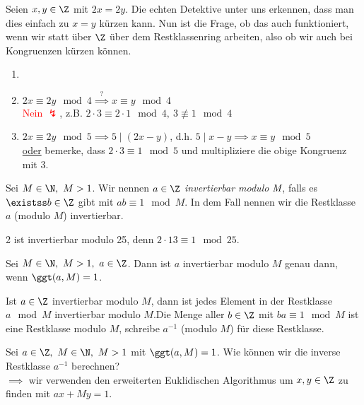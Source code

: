 Seien \( x,y \in \Z \) mit $2x = 2y $. Die echten Detektive unter uns erkennen, dass man dies einfach zu $x = y$ kürzen kann. Nun ist die Frage, ob das auch funktioniert, wenn wir statt über $\Z$ über dem Restklassenring arbeiten, also ob wir auch bei Kongruenzen kürzen können.

\begin{exmp*}
	\begin{enumerate}
		\item[]
		\item \( 2x \equiv 2y \mod 4 \overset{?}{\implies} x \equiv y \mod 4 \)\\
			\textcolor{red}{Nein $\lightning$}, z.B. \( 2 \cdot 3 \equiv 2 \cdot 1 \mod 4,\ 3 \not\equiv 1 \mod 4 \)
		\item \( 2x \equiv 2y \mod 5 \implies 5 \mid (2x-y) \), d.h. \( 5 \mid x-y \implies x \equiv y \mod 5 \)\\
			\underline{oder} bemerke, dass \( 2 \cdot 3 \equiv 1 \mod 5 \) und multipliziere die obige Kongruenz mit 3.
	\end{enumerate}
\end{exmp*}

\begin{defn*}
	Sei \( M \in \N,\ M > 1 \). Wir nennen \( a \in \Z \) \emph{invertierbar modulo $\emph{M}$}, falls es \( \existss b \in \Z \) gibt mit \( ab \equiv 1 \mod M \). In dem Fall nennen wir die Restklasse \( a\) (modulo $M$) invertierbar.
\end{defn*}

\begin{exmp*}
	2 ist invertierbar modulo 25, denn \( 2 \cdot 13 \equiv 1 \mod 25 \).
\end{exmp*}

\begin{thm}\autolabel
	Sei \( M \in \N,\ M > 1,\ a \in \Z \). Dann ist $a$ invertierbar modulo $M$ genau dann, wenn \( \ggt(a,M) = 1 \).
\end{thm}

\begin{rem*}
	Ist \( a \in \Z \) invertierbar modulo $M$, dann ist jedes Element in der Restklasse $a \mod M$ invertierbar modulo $M$.\video Die Menge aller $b \in \Z$ mit $ba \equiv 1 \mod M$ ist eine Restklasse modulo $M$, schreibe $a^{-1}$ (modulo $M$) für diese Restklasse.
\end{rem*}

Sei \( a \in \Z,\ M \in \N,\ M > 1 \) mit \( \ggt(a,M) = 1 \). Wie können wir die inverse Restklasse $a^{-1}$ berechnen?\\
$\implies$ wir verwenden den erweiterten Euklidischen Algorithmus um \( x,y \in \Z \) zu finden mit \( ax+My = 1 \).

